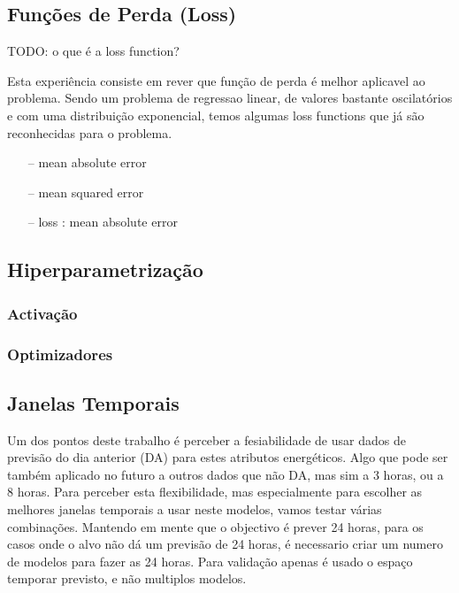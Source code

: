 \subsection{Funções de Perda (Loss)}

TODO: o que é a loss function?

Esta experiência consiste em rever que função de perda é melhor aplicavel ao problema. Sendo um problema de regressao linear, de valores bastante oscilatórios e com uma distribuição exponencial, temos algumas loss functions que já são reconhecidas para o problema.

\begin{itemize}
    \item[--] mean absolute error
    \item[--] mean squared error    
    \item[--] loss : mean absolute error

\end{itemize}



\subsection{Hiperparametrização}

\subsubsection{Activação}

\subsubsection{Optimizadores}

\subsection{Janelas Temporais}

Um dos pontos deste trabalho é perceber a fesiabilidade de usar dados de previsão do dia anterior (DA) para estes atributos energéticos.
Algo que pode ser também aplicado no futuro a outros dados que não DA, mas sim a 3 horas, ou a 8 horas.
Para perceber esta flexibilidade, mas especialmente para escolher as melhores janelas temporais a usar neste modelos, vamos testar várias combinações.
Mantendo em mente que o objectivo é prever 24 horas, para os casos onde o alvo não dá um previsão de 24 horas, é necessario criar um numero de modelos para fazer as 24 horas.
Para validação apenas é usado o espaço temporar previsto, e não multiplos modelos.

